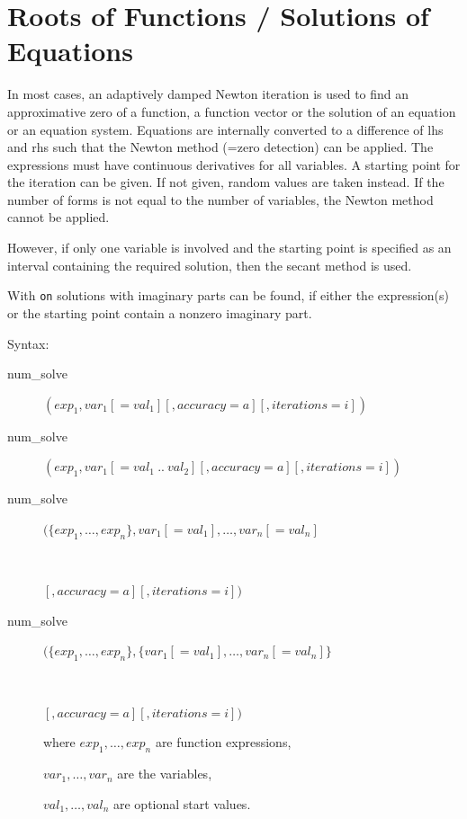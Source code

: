 \section{Roots of Functions / Solutions of Equations}
\hypertarget{operator:NUM_SOLVE}{}

In most cases,
an adaptively damped Newton iteration is used to find
an approximative zero of a function, a function vector or the solution
of an equation or an equation system. Equations are
internally converted to a difference of lhs and rhs such
that the Newton method (=zero detection) can be applied. The expressions
must have continuous derivatives for all variables.
A starting point for the iteration can be given. If not given,
random values are taken instead. If the number of
forms is not equal to the number of variables, the
Newton method cannot be applied.


However, if only one variable is involved and the starting point is
specified as an interval containing the required solution, then the
secant method is used.

With \texttt{on}  solutions with imaginary parts can be
found, if either the expression(s) or the starting point
contain a nonzero imaginary part.

Syntax:

\begin{description}
\item[num\_solve]  $(exp_1, var_1[=val_1][,accuracy=a][,iterations=i])$

\item[num\_solve]  $(exp_1, var_1[=val_1~..~val_2][,accuracy=a][,iterations=i])$

\item[num\_solve]  $(\{exp_1,\ldots,exp_n\},
   var_1[=val_1],\ldots,var_n[=val_n]$
\item[\ \ \ \ \ \ \ \ ]$[,accuracy=a][,iterations=i])$

\item[num\_solve]  $(\{exp_1,\ldots,exp_n\},
   \{var_1[=val_1],\ldots,var_n[=val_n]\}$
\item[\ \ \ \ \ \ \ \ ]$[,accuracy=a][,iterations=i])$

where $exp_1, \ldots, exp_n$ are function expressions,

      $var_1, \ldots, var_n$ are the variables,

      $val_1, \ldots, val_n$ are optional start values.
\end{description}

